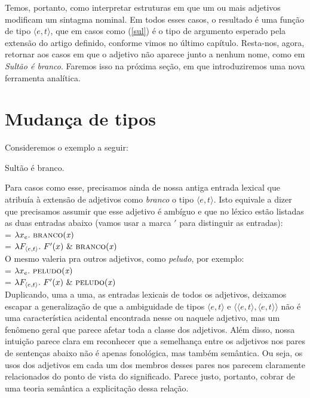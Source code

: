 \n Temos, portanto, como interpretar estruturas em que um ou mais
adjetivos modificam um sintagma nominal. Em todos esses casos, o resultado é uma função de tipo $\langle e,t\rangle$, que em casos como (\ref{sul}) é o tipo de argumento esperado pela extensão do artigo definido, conforme vimos no último capítulo. Resta-nos, agora, retornar aos
casos em que o adjetivo não aparece junto a nenhum nome, como em \textit{Sultão é branco}. Faremos isso na próxima seção, em que introduziremos uma nova ferramenta analítica.

\section{Mudança de tipos}

Consideremos o exemplo a seguir:

\begin{exe}
\ex Sultão é branco.\label{wer}
\end{exe}

\n Para casos como esse, precisamos ainda de nossa antiga entrada
lexical que atribuía à extensão de adjetivos como \textit{branco}
o tipo $\langle e,t\rangle$. Isto equivale a dizer que precisamos
assumir que esse adjetivo é ambíguo e que no léxico estão listadas
as duas entradas abaixo (vamos usar a marca $'$ para distinguir as
entradas):\\

\n {} = $\lambda x_{e}.\ \predica{branco}{x}$\\

\n {} = $\lambda F_{\langle e,t\rangle}.\ F'(x)\ \&\ \predica{branco}{x}$\\

\n O mesmo valeria pra outros adjetivos, como \textit{peludo}, por
exemplo:\\

\n {} = $\lambda x_{e}.\ \predica{peludo}{x}$\\

\n {} = $\lambda F_{\langle e,t\rangle}.\ F'(x)\ \&\ \predica{peludo}{x}$\\


\n Duplicando, uma a uma,  as entradas lexicais de todos os
adjetivos, deixamos escapar a generalização de que a ambiguidade
de tipos $\langle e,t\rangle$ e $\langle\langle e,t\rangle,\langle
e,t\rangle\rangle$ não é uma característica acidental encontrada
nesse ou naquele adjetivo, mas um fenômeno geral que parece afetar
toda a classe dos adjetivos. Além disso, nossa intuição parece
clara em reconhecer que a semelhança entre os adjetivos nos pares
de sentenças abaixo não é apenas fonológica, mas também semântica. Ou seja, os usos dos adjetivos em cada um dos membros desses pares
nos parecem claramente relacionados do ponto de vista do
significado. Parece justo, portanto, cobrar de uma teoria semântica a explicitação dessa relação.

